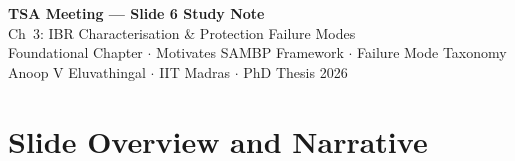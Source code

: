 \documentclass[12pt,a4paper]{article}
\begin{document}
\begin{tcolorbox}[colback=iitmnavy,coltext=white,arc=4pt,boxrule=0pt]
\begin{center}
  {\Large\bfseries TSA Meeting --- Slide 6 Study Note}\\[4pt]
  {\large Ch~3: IBR Characterisation \& Protection Failure Modes}\\[6pt]
  {\normalsize Foundational Chapter $\cdot$ Motivates SAMBP Framework $\cdot$ Failure Mode Taxonomy}\\[2pt]
  {\small Anoop V Eluvathingal $\cdot$ IIT Madras $\cdot$ PhD Thesis 2026}
\end{center}
\end{tcolorbox}

\vspace{6pt}

\section{Slide Overview and Narrative}
\end{document}
